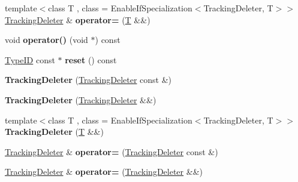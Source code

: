 \begin{DoxyCompactItemize}
{\footnotesize template$<$class T , class  = Enable\+If\+Specialization$<$\+Tracking\+Deleter, T$>$$>$ }\\\mbox{\hyperlink{struct_tracking_deleter}{Tracking\+Deleter}} \& {\bfseries operator=} (\mbox{\hyperlink{struct_t}{T}} \&\&)
\item 
\mbox{\label{struct_tracking_deleter_ae07ab19cc0c8effadff7e39004ac2d73}} 
void {\bfseries operator()} (void $\ast$) const
\item 
\mbox{\label{struct_tracking_deleter_ad712e8bf1d8a1d2fef392116e4786a18}} 
\mbox{\hyperlink{struct_type_i_d}{Type\+ID}} const  $\ast$ {\bfseries reset} () const
\item 
\mbox{\label{struct_tracking_deleter_a59fa5d623d4d7e3820bccc2524f8e275}} 
{\bfseries Tracking\+Deleter} (\mbox{\hyperlink{struct_tracking_deleter}{Tracking\+Deleter}} const \&)
\item 
\mbox{\label{struct_tracking_deleter_ae4c26c0851a588e434571dd68cfab293}} 
{\bfseries Tracking\+Deleter} (\mbox{\hyperlink{struct_tracking_deleter}{Tracking\+Deleter}} \&\&)
\item 
\mbox{\label{struct_tracking_deleter_a9662433603fc26bd5d04f2275114b2c2}} 
{\footnotesize template$<$class T , class  = Enable\+If\+Specialization$<$\+Tracking\+Deleter, T$>$$>$ }\\{\bfseries Tracking\+Deleter} (\mbox{\hyperlink{struct_t}{T}} \&\&)
\item 
\mbox{\label{struct_tracking_deleter_abaa0c5a565e58e8667b4ac13737ad13b}} 
\mbox{\hyperlink{struct_tracking_deleter}{Tracking\+Deleter}} \& {\bfseries operator=} (\mbox{\hyperlink{struct_tracking_deleter}{Tracking\+Deleter}} const \&)
\item 
\mbox{\label{struct_tracking_deleter_a0129438eadeb6d4a139a555696fdcbd7}} 
\mbox{\hyperlink{struct_tracking_deleter}{Tracking\+Deleter}} \& {\bfseries operator=} (\mbox{\hyperlink{struct_tracking_deleter}{Tracking\+Deleter}} \&\&)
\item 
\mbox{\label{struct_tracking_deleter_a640c59c2e95166d81a139e19e5092c78}} 

\end{DoxyCompactItemize}
